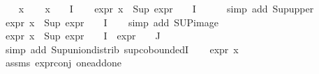 \begin{isabellebody}
%
\isadelimproof
%
\endisadelimproof
%
\isatagproof
{}\isamarkupfalse%
\isanewline
\ \ \isamarkupfalse%
\ x\isanewline
\ \ \isamarkupfalse%
\ {\isachardoublequoteopen}x\ {\isasymin}\ {\isasymPhi}\ {\isacharbackquote}{\kern0pt}\ I{\isachardoublequoteclose}\isanewline
\ \ \isamarkupfalse%
\ {\isachardoublequoteopen}expr{\isacharunderscore}{\kern0pt}{}\ x\ {\isasymle}\ Sup\ {\isacharparenleft}{\kern0pt}expr{\isacharunderscore}{\kern0pt}{}\ {\isacharbackquote}{\kern0pt}\ {\isasymPhi}\ {\isacharbackquote}{\kern0pt}\ I{\isacharparenright}{\kern0pt}{\isachardoublequoteclose}\isanewline
\ \ \ \ \isamarkupfalse%
\ {\isacharparenleft}{\kern0pt}simp\ add{\isacharcolon}{\kern0pt}\ Sup{\isacharunderscore}{\kern0pt}upper{\isacharparenright}{\kern0pt}\isanewline
{}\isamarkupfalse%
\ {\isachardoublequoteopen}expr{\isacharunderscore}{\kern0pt}{}\ x\ {\isasymle}\ Sup\ {\isacharparenleft}{\kern0pt}{\isacharparenleft}{\kern0pt}expr{\isacharunderscore}{\kern0pt}{}\ {\isasymcirc}\ {\isasymPhi}{\isacharparenright}{\kern0pt}\ {\isacharbackquote}{\kern0pt}\ I{\isacharparenright}{\kern0pt}{\isachardoublequoteclose}\isanewline
\ \ \isamarkupfalse%
\ {\isacharparenleft}{\kern0pt}simp\ add{\isacharcolon}{\kern0pt}\ SUP{\isacharunderscore}{\kern0pt}image{\isacharparenright}{\kern0pt}\isanewline
\ \ \isamarkupfalse%
\ {\isachardoublequoteopen}expr{\isacharunderscore}{\kern0pt}{}\ x\ {\isasymle}\ Sup\ {\isacharparenleft}{\kern0pt}{\isacharparenleft}{\kern0pt}expr{\isacharunderscore}{\kern0pt}{}\ {\isasymcirc}\ {\isasymPhi}{\isacharparenright}{\kern0pt}\ {\isacharbackquote}{\kern0pt}\ I\ {\isasymunion}\ {\isacharparenleft}{\kern0pt}expr{\isacharunderscore}{\kern0pt}{}\ {\isasymcirc}\ {\isasymPhi}{\isacharparenright}{\kern0pt}\ {\isacharbackquote}{\kern0pt}\ J{\isacharparenright}{\kern0pt}{\isachardoublequoteclose}\isanewline
\ \ \ \ \isamarkupfalse%
\ {\isacharparenleft}{\kern0pt}simp\ add{\isacharcolon}{\kern0pt}\ Sup{\isacharunderscore}{\kern0pt}union{\isacharunderscore}{\kern0pt}distrib\ sup{\isachardot}{\kern0pt}coboundedI{}{\isacharparenright}{\kern0pt}\isanewline
\ \ \isamarkupfalse%
\ {\isachardoublequoteopen}expr{\isacharunderscore}{\kern0pt}{}\ x\ {\isasymle}\ {}{\isachardoublequoteclose}\ \isamarkupfalse%
\ assms{\isacharparenleft}{\kern0pt}{}{\isacharparenright}{\kern0pt}\ expr{\isacharunderscore}{\kern0pt}{}{\isacharunderscore}{\kern0pt}conj\ one{\isacharunderscore}{\kern0pt}add{\isacharunderscore}{\kern0pt}one\isanewline

\end{isabellebody}
